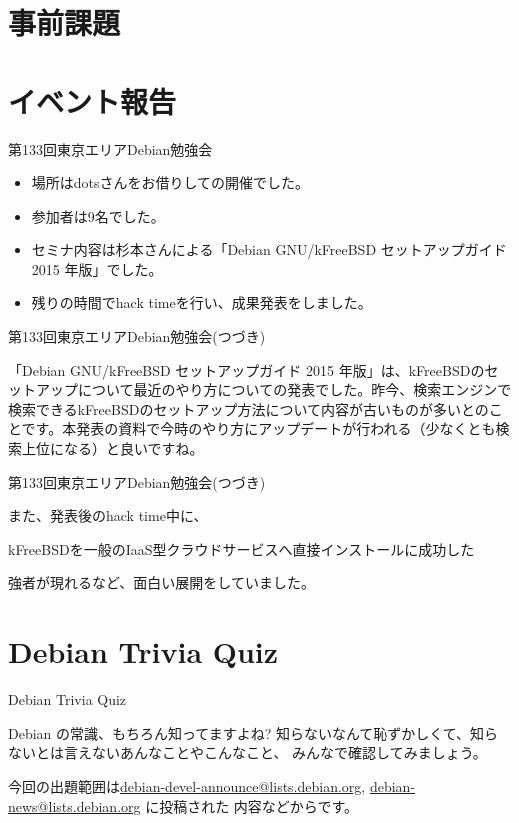 \section{事前課題}
{\footnotesize
 
}

\section{イベント報告}

\begin{frame}{第133回東京エリアDebian勉強会 }

\begin{itemize}
\item 場所はdotsさんをお借りしての開催でした。
\item 参加者は9名でした。
\item セミナ内容は杉本さんによる「Debian GNU/kFreeBSD セットアップガイド 2015 年版」でした。
\item 残りの時間でhack timeを行い、成果発表をしました。
\end{itemize} 
\end{frame}

\begin{frame}{第133回東京エリアDebian勉強会(つづき)}

 「Debian GNU/kFreeBSD セットアップガイド 2015 年版」は、kFreeBSDのセットアップについて最近のやり方についての発表でした。昨今、検索エンジンで検索できるkFreeBSDのセットアップ方法について内容が古いものが多いとのことです。本発表の資料で今時のやり方にアップデートが行われる（少なくとも検索上位になる）と良いですね。
\end{frame}

\begin{frame}{第133回東京エリアDebian勉強会(つづき)}

  また、発表後のhack time中に、
\begin{center}
\LARGE
  kFreeBSDを一般のIaaS型クラウドサービスへ直接インストールに成功した
\end{center}
強者が現れるなど、面白い展開をしていました。

\end{frame}

\section{Debian Trivia Quiz}
\begin{frame}{Debian Trivia Quiz}

  Debian の常識、もちろん知ってますよね?
知らないなんて恥ずかしくて、知らないとは言えないあんなことやこんなこと、
みんなで確認してみましょう。

今回の出題範囲は\url{debian-devel-announce@lists.debian.org},
\url{debian-news@lists.debian.org} に投稿された
内容などからです。

\end{frame}

